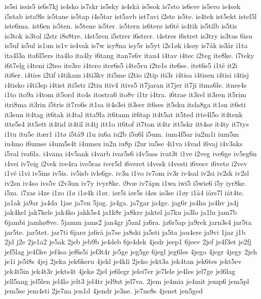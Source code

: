 {is5si
issis5
is6s7kj
is4sko
is7skr
is5sky
is4sk^^e5
is5sok
is7sto
is6sve
is5svo
is4s^^f8k
i5stab
ista9le
is5tane
is5tap
i4s5tar
ist5avb
ist7avi
i2ste
is5te.
is4tek
ist5ekt
istel5l
iste6ma.
ist6en
is5ten.
is5tene
is5ter.
is5tern
is6ter^^f8
is6t^^e9
is4tik
is5tilb
is5tis
is3tok
is3tol
i2str
i8s8tre.
i4st5ren
i5strer
i6strer.
i4stres
i6stret
is3try
is3tus
6isu
is5uf
is5ul
is1un
is1v
is4vak
is7w
isy8na
isy5r
is5yt
i2s1^^f8k
i4s^^f8y
is7^^e5k
is3^^e5r
i1ta
ita4l3a
ita6l5ers
ita4lo
ita4ly
i6tang
itan7s6v
itau4
i4tav
i4tec
i2teg
ite8ke.
i7teky
i6t7elg
i4teni
i2teo
ite3re
i4tero
iter6s5
i4te5ru
i2te1s
ite6se.
itet6s5
i1t^^e9
it2i
iti6er.
i4ties
i2tif
i4tikam
i4ti3kv
iti5me
i2tio
i2tip
iti3r
i4tisa
i4tisen
i4tisi
i4tisj
i4tisko
i4ti3sp
i4tist
iti5str
i2tiu
itiv4
itivs5
it7jaran
it7jer
it7ji
itma6le.
itnes4s
i1to
ito9a
i4tom
it5ord
ito4s
itostra6
ito8v
i1tr
i4tra.
i6trae
it3rel
it3ren
it5rim
itri8ma
it3rin
i5tris
it7ro6s
it1sa
it4s3ei
it3ser
it6ses
it5sku
itsla8ga
it1sn
it6sti
it3sun
it4tag
it6tak
it4tal
itta9la
it6tann
it6tap
it4t5at
it5ted
itte4l5o
it4tenk
itte5s4
itt5ett
it4tid
it4til
it4tj
itt1o
it6tof
it7ton
it4tr
itt5skr
itt4s^^f8
it4ty
it7tys
i1tu
itu5e
it^^e6r1
i1t^^f8
i5t^^e59
i1u
iu6a
iu2b
i5u6l
i5um.
ium4f5ar
iu2m1i
ium5m
iu4mo
i6umse
i4um5s4t
i4umsu
iu2n
iu8p
i2ur
iu5se
4i1va
i4vad
i6vaj
i4v3aks
i5val
iva6la.
i4vana
i4v5ank
i4varb
ivar5s6
i4v5ass
ivat3t
i1ve
i2veg
ive6ge
iv5eg6n
i4vei
iv7eig
i2vek
ive4ra
ive5ras
iver5d
i6veret
i4vesk
i4vesti
i6vesv
i6vet^^f8
i2vev
i1v^^e9
i1vi
iv5ins
iv5is.
iv5isb
ivle6ge.
iv3n
i1vo
iv7om
iv3r
iv4sal
iv2si
iv2sk
iv2sl
iv2sn
iv4so
ivs5v
i2v3un
iv7y
ivyr8ke.
i9v^^e6
iv7^^e5pn
i1wa
iwi5
i5wie6
i5y
iyr8ke.
i5za.
i7zas
i4ze
i1zo
i1^^f8
i1^^f84k
i1^^f8r.
i^^f8r5i
i^^f8r5s
i4^^f8s
i^^f83se
i1^^f8y
i1^^e54
i^^e5rs7l
i^^e5t4te.
ja1ak
ja9ar
ja4da
1jae
ja7en
5jag.
ja4ga.
ja7gar
ja4ge.
jag6r
ja4ha
ja4hv
ja4j
jak4kel
jak7kele
jak4ko
jakk5s4
ja1k8r
ja8kre
jaktel
ja7ku
ja3lo
ja1lu
jam7b
6jambi
jamh^^f88ve.
5jamm
jams2
jan4gr
j5anl
ja6ra.
ja6r5ap
ja9rek
jarn3s4
jar5ta
jar5te.
jar5tet.
jar7ti
6jar^^f8
ja6r^^e5
ja7se
ja8ski
ja5sti
ja5ta
jau4ere
ja9vi
1jaz
j1b
2jd
j2e
2je1a2
je5ak
2jeb
jeb9b
je4deb
6je4dek
4jedr
jeep1
6jeev
2jef
je4f3et
je2fj
jef5lag
je4f3re
jef4sa
jef6s5i
jef3t4r
je5ge
jeg5ge
6jegl
jeg6les
4jego
4jegr
4jegy
2jeh
je1i
je5i8s
4jej
2jeka
jek6keru
4jekl
je4kli
2jeko
jekt3a
jek4tan
jek6tes
jekt5ev
jek4t5in
jek4t3r
jekts4t
4jek^^f8
2jel
je6legr
jelei7er
je7lele
je4les
jel7ge
jel6lag
jell5ang
jel5len
jel4lo
jelt3
jel4tr
jel9ut
jel7va.
2jem
je4mia
je4mit
jemp6
jem5pl
jem5se
jem4sti
2je7na
jen1d
4jendr
je3ne.
je7ne8s
4jenet
jen5ged
}
